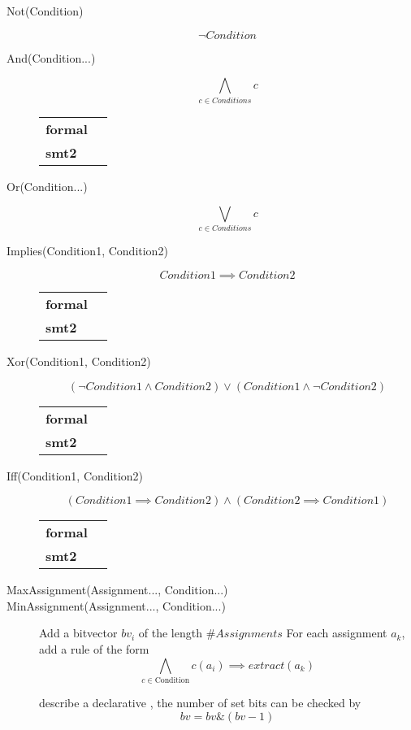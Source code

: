 \begin{description}
\item[Not(Condition)]
$$ \neg Condition $$



\item[And(Condition...)]
$$ \bigwedge_{c\in Conditions} c$$

\begin{tabular}{l l}
	\textbf{formal} & \\
	\textbf{smt2} & 
\end{tabular}


\item[Or(Condition...)]
$$ \bigvee_{c\in Conditions} c$$


\item[Implies(Condition1, Condition2)]
$$ Condition1 \implies Condition2 $$

\begin{tabular}{l l}
	\textbf{formal} & \\
	\textbf{smt2} & 
\end{tabular}


\item[Xor(Condition1, Condition2)]
$$ (\neg Condition1 \wedge Condition2) \vee (Condition1 \wedge \neg Condition2) $$

\begin{tabular}{l l}
	\textbf{formal} & \\
	\textbf{smt2} & 
\end{tabular}


\item[Iff(Condition1, Condition2)]
$$ (Condition1 \implies Condition2) \wedge (Condition2 \implies Condition1) $$

\begin{tabular}{l l}
	\textbf{formal} & \\
	\textbf{smt2} & 
\end{tabular}


\item[MaxAssignment(Assignment..., Condition...)]
\item[MinAssignment(Assignment..., Condition...)]

Add a bitvector $bv_i$ of the length $\#Assignments$
For each assignment $a_k$, add a rule of the form
$$ \bigwedge_{c\in\text{Condition}} c(a_i) \implies extract(a_k) $$


\cite{erkinger2017personnel} describe a declarative  , the number of set bits can be checked by 
$$ bv = bv \& (bv - 1) $$


\end{description}
